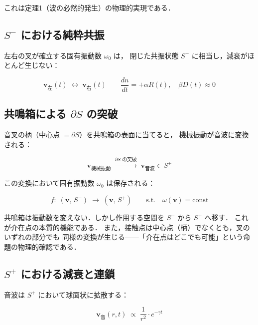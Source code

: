 \documentclass[12pt, a4paper]{article}
\theoremstyle{definition}
\begin{document}
これは定理1（波の必然的発生）の物理的実現である．

\subsection{$S^-$ における純粋共振}

左右の叉が確立する固有振動数 $\omega_0$ は，
閉じた共振状態 $S^-$ に相当し，減衰がほとんど生じない：

\begin{equation}
  \mathbf{v}_{\text{左}}(t) \;\longleftrightarrow\; \mathbf{v}_{\text{右}}(t)
  \qquad
  \frac{dn}{dt} = +\alpha R(t), \quad \beta D(t) \approx 0
\end{equation}

\subsection{共鳴箱による $\partial S$ の突破}

音叉の柄（中心点 $= \partial S$）を共鳴箱の表面に当てると，
機械振動が音波に変換される：

\begin{equation}
  \mathbf{v}_{\text{機械振動}}
  \;\xrightarrow{\partial S \text{ の突破}}\;
  \mathbf{v}_{\text{音波}} \in S^+
\end{equation}

この変換において固有振動数 $\omega_0$ は保存される：

\begin{equation}
  f:\; (\mathbf{v},\, S^-) \;\to\; (\mathbf{v},\, S^+)
  \qquad \text{s.t.}\quad \omega(\mathbf{v}) = \mathrm{const}
  \label{eq:boundary_transform}
\end{equation}

共鳴箱は振動数を変えない．しかし作用する空間を $S^-$ から $S^+$ へ移す．
これが介在点の本質的機能である．
また，接触点は中心点（柄）でなくとも，叉のいずれの部分でも
同様の変換が生じる——「介在点はどこでも可能」という命題の物理的確認である．

\subsection{$S^+$ における減衰と連鎖}

音波は $S^+$ において球面状に拡散する：

\begin{equation}
  \mathbf{v}_{\text{音}}(r, t) \;\propto\; \frac{1}{r^2} \cdot e^{-\gamma t}
\end{equation}
\end{document}
